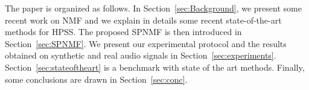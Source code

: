 The paper is organized as follows. In Section~\ref{sec:Background}, we present some recent work on NMF and we explain in details some recent state-of-the-art methods for HPSS. The proposed SPNMF is then introduced in Section~\ref{sec:SPNMF}. We present our experimental protocol and the results obtained on synthetic and real audio signals in Section~\ref{sec:experiments}. Section~\ref{sec:stateoftheart} is a benchmark with state of the art methods. Finally, some conclusions are drawn in Section~\ref{sec:conc}.


